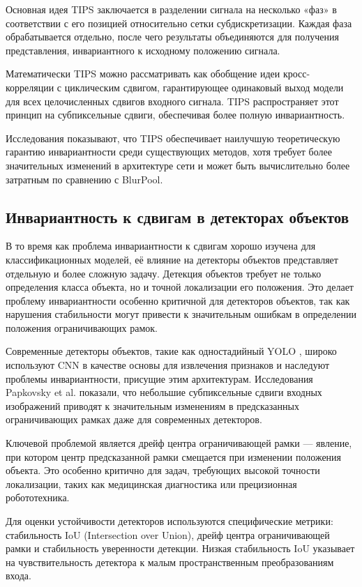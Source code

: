 Основная идея TIPS заключается в разделении сигнала на несколько «фаз» в соответствии с его позицией относительно сетки субдискретизации. Каждая фаза обрабатывается отдельно, после чего результаты объединяются для получения представления, инвариантного к исходному положению сигнала.

Математически TIPS можно рассматривать как обобщение идеи кросс-корреляции с циклическим сдвигом, гарантирующее одинаковый выход модели для всех целочисленных сдвигов входного сигнала. TIPS распространяет этот принцип на субпиксельные сдвиги, обеспечивая более полную инвариантность.

Исследования показывают, что TIPS обеспечивает наилучшую теоретическую гарантию инвариантности среди существующих методов, хотя требует более значительных изменений в архитектуре сети и может быть вычислительно более затратным по сравнению с BlurPool.

\subsection{Инвариантность к сдвигам в детекторах объектов}
\label{review:detectors}

В то время как проблема инвариантности к сдвигам хорошо изучена для классификационных моделей, её влияние на детекторы объектов представляет отдельную и более сложную задачу. Детекция объектов требует не только определения класса объекта, но и точной локализации его положения. Это делает проблему инвариантности особенно критичной для детекторов объектов, так как нарушения стабильности могут привести к значительным ошибкам в определении положения ограничивающих рамок.

Современные детекторы объектов, такие как одностадийный YOLO \cite{redmon2016yolo}, широко используют CNN в качестве основы для извлечения признаков и наследуют проблемы инвариантности, присущие этим архитектурам. Исследования Papkovsky et al. \cite{papkovsky2023shift} показали, что небольшие субпиксельные сдвиги входных изображений приводят к значительным изменениям в предсказанных ограничивающих рамках даже для современных детекторов.

Ключевой проблемой является дрейф центра ограничивающей рамки — явление, при котором центр предсказанной рамки смещается при изменении положения объекта. Это особенно критично для задач, требующих высокой точности локализации, таких как медицинская диагностика или прецизионная робототехника.

Для оценки устойчивости детекторов используются специфические метрики: стабильность IoU (Intersection over Union), дрейф центра ограничивающей рамки и стабильность уверенности детекции. Низкая стабильность IoU указывает на чувствительность детектора к малым пространственным преобразованиям входа.

